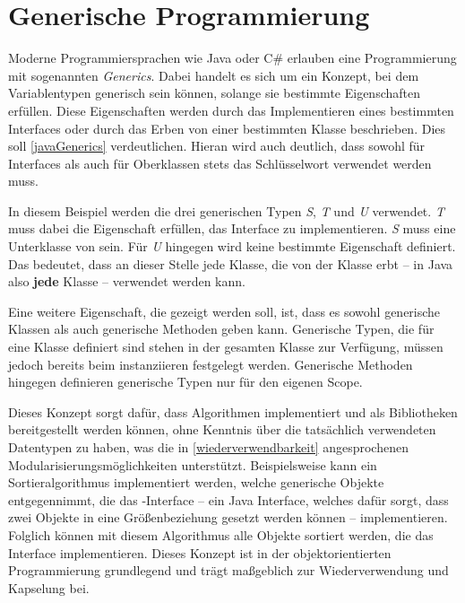 \section{Generische Programmierung}
Moderne Programmiersprachen wie Java oder C\# erlauben eine Programmierung mit sogenannten \textit{Generics}. Dabei handelt es sich um ein Konzept, bei dem Variablentypen generisch sein können, solange sie bestimmte Eigenschaften erfüllen. Diese Eigenschaften werden durch das Implementieren eines bestimmten Interfaces oder durch das Erben von einer bestimmten Klasse beschrieben. Dies soll \autoref{javaGenerics} verdeutlichen. Hieran wird auch deutlich, dass sowohl für Interfaces als auch für Oberklassen stets das Schlüsselwort  verwendet werden muss.


In diesem Beispiel werden die drei generischen Typen \textit{S}, \textit{T} und \textit{U} verwendet. \textit{T} muss dabei die Eigenschaft erfüllen, das  Interface zu implementieren. \textit{S} muss eine Unterklasse von  sein. Für \textit{U} hingegen wird keine bestimmte Eigenschaft definiert. Das bedeutet, dass an dieser Stelle jede Klasse, die von der Klasse  erbt -- in Java also \textbf{jede} Klasse -- verwendet werden kann. 

Eine weitere Eigenschaft, die gezeigt werden soll, ist, dass es sowohl generische Klassen als auch generische Methoden geben kann. Generische Typen, die für eine Klasse definiert sind stehen in der gesamten Klasse zur Verfügung, müssen jedoch bereits beim instanziieren festgelegt werden. Generische Methoden hingegen definieren generische Typen nur für den eigenen Scope.

Dieses Konzept sorgt dafür, dass Algorithmen implementiert und als Bibliotheken bereitgestellt werden können, ohne Kenntnis über die tatsächlich verwendeten Datentypen zu haben, was die in \autoref{wiederverwendbarkeit} angesprochenen Modularisierungsmöglichkeiten unterstützt. Beispielsweise kann ein Sortieralgorithmus implementiert werden, welche generische Objekte entgegennimmt, die das -Interface -- ein Java Interface, welches dafür sorgt, dass zwei Objekte in eine Größenbeziehung gesetzt werden können -- implementieren. Folglich können mit diesem Algorithmus alle Objekte sortiert werden, die das Interface implementieren. Dieses Konzept ist in der objektorientierten Programmierung grundlegend und trägt maßgeblich zur Wiederverwendung und Kapselung bei.